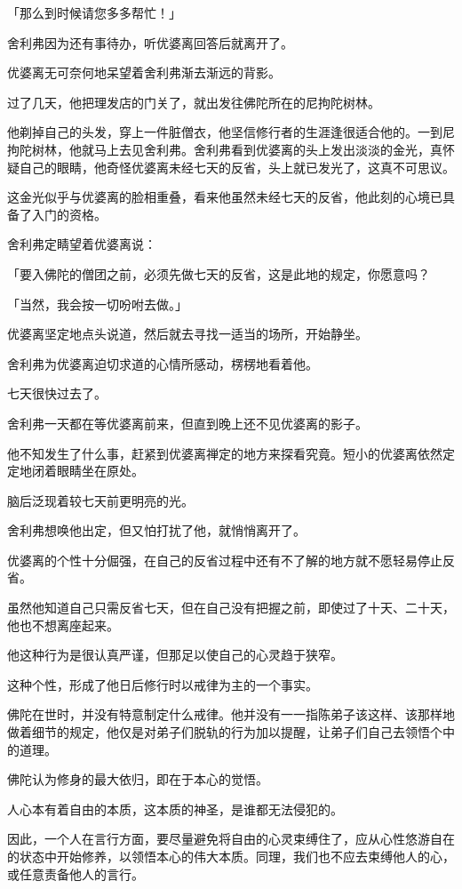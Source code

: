 \documentclass[twoside,openany]{book}
\begin{document}
「那么到时候请您多多帮忙！」

舍利弗因为还有事待办，听优婆离回答后就离开了。

优婆离无可奈何地呆望着舍利弗渐去渐远的背影。

过了几天，他把理发店的门关了，就出发往佛陀所在的尼拘陀树林。

他剃掉自己的头发，穿上一件脏僧衣，他坚信修行者的生涯逢很适合他的。一到尼拘陀树林，他就马上去见舍利弗。舍利弗看到优婆离的头上发出淡淡的金光，真怀疑自己的眼睛，他奇怪优婆离未经七天的反省，头上就已发光了，这真不可思议。

这金光似乎与优婆离的脸相重叠，看来他虽然未经七天的反省，他此刻的心境已具备了入门的资格。

舍利弗定睛望着优婆离说：

「要入佛陀的僧团之前，必须先做七天的反省，这是此地的规定，你愿意吗？

「当然，我会按一切吩咐去做。」

优婆离坚定地点头说道，然后就去寻找一适当的场所，开始静坐。

舍利弗为优婆离迫切求道的心情所感动，楞楞地看着他。

七天很快过去了。

舍利弗一天都在等优婆离前来，但直到晚上还不见优婆离的影子。

他不知发生了什么事，赶紧到优婆离禅定的地方来探看究竟。短小的优婆离依然定定地闭着眼睛坐在原处。

脑后泛现着较七天前更明亮的光。

舍利弗想唤他出定，但又怕打扰了他，就悄悄离开了。

优婆离的个性十分倔强，在自己的反省过程中还有不了解的地方就不愿轻易停止反省。

虽然他知道自己只需反省七天，但在自己没有把握之前，即使过了十天、二十天，他也不想离座起来。

他这种行为是很认真严谨，但那足以使自己的心灵趋于狭窄。

这种个性，形成了他日后修行时以戒律为主的一个事实。

佛陀在世时，并没有特意制定什么戒律。他并没有一一指陈弟子该这样、该那样地做着细节的规定，他仅是对弟子们脱轨的行为加以提醒，让弟子们自己去领悟个中的道理。

佛陀认为修身的最大依归，即在于本心的觉悟。

人心本有着自由的本质，这本质的神圣，是谁都无法侵犯的。

因此，一个人在言行方面，要尽量避免将自由的心灵束缚住了，应从心性悠游自在的状态中开始修养，以领悟本心的伟大本质。同理，我们也不应去束缚他人的心，或任意责备他人的言行。
\end{document}
